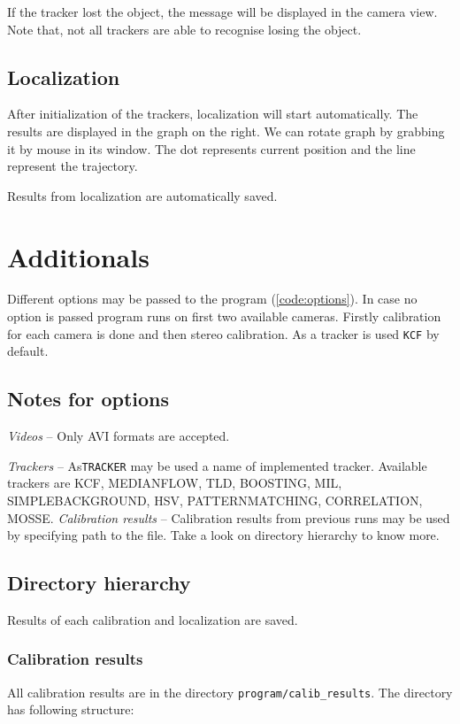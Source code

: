 If the tracker lost the object, the message will be displayed in the camera
view. Note that, not all trackers are able to recognise losing the object.

\subsection{Localization}
After initialization of the trackers, localization will start automatically.
The results are displayed in the graph on the right. We can rotate graph by
grabbing it by mouse in its window. The dot represents current position and the
line represent the trajectory.

Results from localization are automatically saved.

\section{Additionals}

Different options may be passed to the program (\ref{code:options}). In case no option
is passed program runs on first two available cameras. Firstly calibration for
each camera is done and then stereo calibration. As a tracker is used \verb+KCF+ by default.

\begin{figure}
\lstset{basicstyle=\ttfamily\footnotesize,breaklines=true,frame=lrtb}

\end{figure}

\subsection{Notes for options}
\emph{Videos} -- Only AVI formats are accepted.

\emph{Trackers} -- As\verb+TRACKER+ may be used a name of implemented tracker. Available trackers
are KCF, MEDIANFLOW, TLD, BOOSTING, MIL, SIMPLEBACKGROUND, HSV,
PATTERNMATCHING, CORRELATION, MOSSE.
\emph{Calibration results} -- Calibration results from previous runs may be
used by specifying path to the file. Take a look on directory hierarchy to know
more.

\subsection{Directory hierarchy}
Results of each calibration and localization are saved.

\subsubsection{Calibration results}
All calibration results are in the directory \verb+program/calib_results+. The
directory has following structure:

